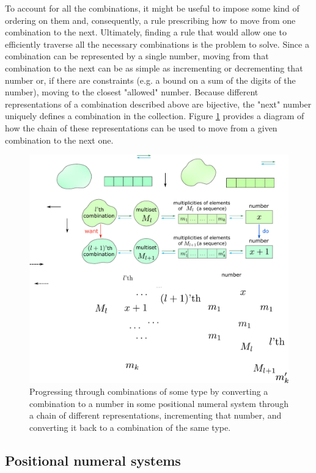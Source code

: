 \documentclass[12pt]{article}
\begin{document}
To account for all the combinations, it might be useful to impose some kind of ordering on them and, consequently, a rule prescribing how to move from one combination to the next. Ultimately, finding a rule that would allow one to efficiently traverse all the necessary combinations is the problem to solve. Since a combination can be represented by a single number, moving from that combination to the next can be as simple as incrementing or decrementing that number or, if there are constraints (e.g. a bound on a sum of the digits of the number), moving to the closest "allowed" number. Because different representations of a combination described above are bijective, the "next" number uniquely defines a combination in the collection. Figure \ref{fig:diag1} provides a diagram of how the chain of these representations can be used to move from a given combination to the next one. 

\begin{figure}
  \centering
  \includegraphics[scale = 0.75]{diagram1a.pdf}
  \caption{Progressing through combinations of some type by converting a combination to a number in some positional numeral system through a chain of different representations, incrementing that number, and converting it back to a combination of the same type.}
  \label{fig:diag1}
\end{figure}

\subsection*{Positional numeral systems}
\end{document}
